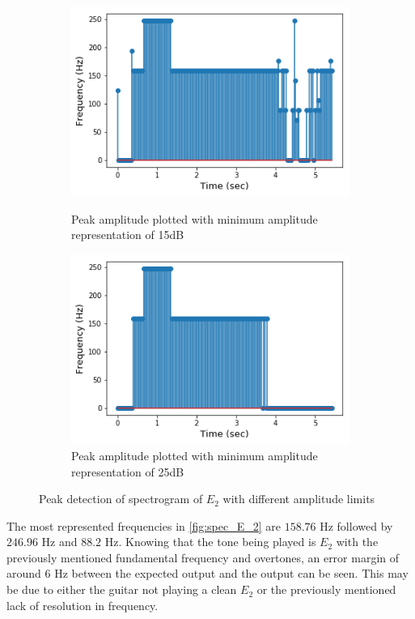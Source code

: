 \begin{figure}[H]
\begin{subfigure}{0.49\textwidth}
\end{subfigure}
\begin{subfigure}{0.49\textwidth}
\centering
\includegraphics[width=\textwidth]{figures/peak_detection/20170511_15.png}
\caption{Peak amplitude plotted with minimum amplitude representation of 15dB}
\label{fig:freq_15dB_Amp_pass}

\includegraphics[width=\textwidth]{figures/peak_detection/20170511_25.png}
\caption{Peak amplitude plotted with minimum amplitude representation of 25dB}
\label{fig:freq_25dB_Amp_pass}

\end{subfigure}
\caption{Peak detection of spectrogram of $E_2$ with different amplitude limits}
\label{fig:valdation_peak_detection}
\end{figure}

The most represented frequencies in \ref{fig:spec_E_2} are $158.76$ Hz followed by $246.96$ Hz and $88.2$ Hz. 
Knowing that the tone being played is $E_2$ with the previously mentioned fundamental frequency and overtones, an error margin of around $6$ Hz between the expected output and the output can be seen.
This may be due to either the guitar not playing a clean $E_2$ or the previously mentioned lack of resolution in frequency.

